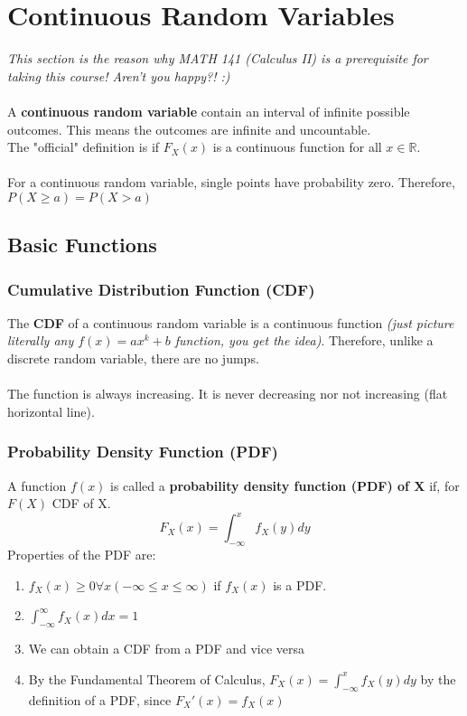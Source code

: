 \documentclass{article}
\begin{document}
\section{Continuous Random Variables}
\textit{This section is the reason why MATH 141 (Calculus II) is a prerequisite for taking this course! Aren't you happy?! :)}
\\\\
A \textbf{continuous random variable} contain an interval of infinite possible outcomes. This means the outcomes are infinite and uncountable.\\
The "official" definition is if $F_X(x)$ is a continuous function for all $x \in \mathds{R}$.\\\\
For a continuous random variable, single points have probability zero. Therefore, $P(X\geq a) = P(X>a)$
\subsection{Basic Functions}
\subsubsection{Cumulative Distribution Function (CDF)}
The \textbf{CDF} of a continuous random variable is a continuous function \textit{(just picture literally any $f(x) = ax^k+b$ function, you get the idea)}.  Therefore, unlike a discrete random variable, there are no jumps.\\\\
The function is always increasing. It is never decreasing nor not increasing (flat horizontal line).
\subsubsection{Probability Density Function (PDF)}
A function $f(x)$ is called a \textbf{probability density function (PDF) of X} if, for $F(X)$ CDF of X.
\[F_X(x)=\int_{-\infty}^xf_X(y)dy\]
Properties of the PDF are:
\begin{enumerate}
    \item $f_X(x)\geq 0 \forall x(-\infty\leq x \leq \infty)$ if $f_X(x)$ is a PDF.
    \item$\int_{-\infty}^{\infty}f_X(x)dx=1$
    \item We can obtain a CDF from a PDF and vice versa
    \item By the Fundamental Theorem of Calculus, $F_X(x)=\int_{-\infty}^xf_X(y)dy$ by the definition of a PDF, since $F_X'(x)=f_X(x)$
\end{enumerate}
\end{document}
